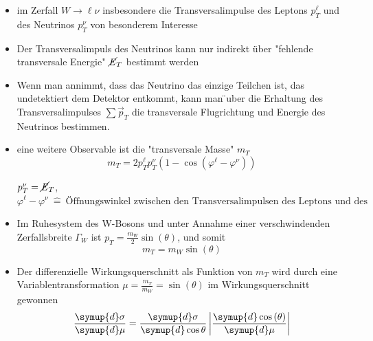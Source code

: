\documentclass[aspectratio=1610, 9pt]{beamer}
\begin{document}
\begin{frame}
  \begin{itemize}
    \item im Zerfall $W \rightarrow \ell \nu$ insbesondere die Transversalimpulse des Leptons $p^\ell_T$ und des Neutrinos $p^\nu_T$ von besonderem Interesse
    \item Der Transversalimpuls des Neutrinos kann nur indirekt über "fehlende transversale Energie"  $\cancel{\it{E}}_{T}$ bestimmt werden
    \item Wenn man annimmt, dass das Neutrino das einzige Teilchen ist, das undetektiert dem Detektor entkommt, kann man ̈uber die Erhaltung des Transversalimpulses $\sum \vec{p}_T$ die transversale Flugrichtung und Energie des Neutrinos bestimmen.
  \end{itemize}
\end{frame}

\begin{frame}
  \begin{itemize}
    \item eine weitere Observable ist die "transversale Masse" $m_T$
    \begin{equation*}
      m_T = 2 p^\ell_T p^\nu_T \left(1 - \cos{\left(\varphi^\ell-\varphi^\nu \right)} \right)
    \end{equation*}
    \begin{center}
      \small{$p^\nu_T = \cancel{\it{E}}_{T}$, $\varphi^\ell-\varphi^\nu \: \hat{=} \: \text{Öffnungswinkel zwischen den Transversalimpulsen des Leptons und des Neutrinos}$}
    \end{center}
    \item Im Ruhesystem des W-Bosons und unter Annahme einer verschwindenden Zerfallsbreite $\Gamma_W$ ist $p_T = \frac{m_W}{2} \sin{(\theta)}$, und somit
    \begin{equation*}
      m_T = m_W \sin{(\theta)}
    \end{equation*}
    \item Der differenzielle Wirkungsquerschnitt als Funktion von $m_T$ wird durch eine Variablentransformation $\mu = \frac{m_T}{m_W} = \sin{(\theta)}$ im Wirkungsquerschnitt gewonnen
    \begin{equation*}
      \frac{\symup{d}\sigma}{\symup{d}\mu} = \frac{\symup{d} \sigma}{\symup{d} \cos{\theta}} \left| \frac{\symup{d} \cos{(\theta)}}{\symup{d} \mu} \right|
    \end{equation*}
  \end{itemize}
\end{frame}
\end{document}

